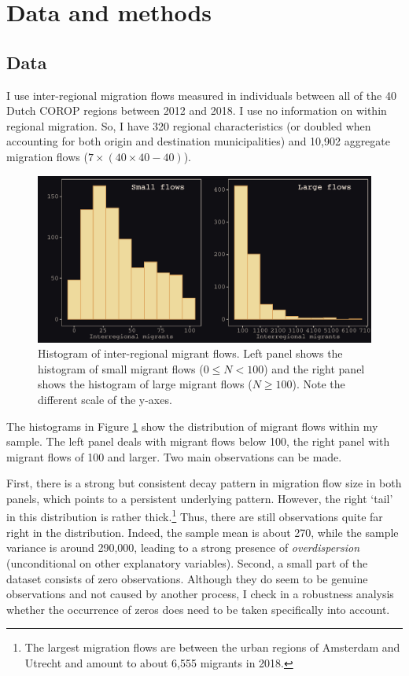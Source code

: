 \documentclass[11pt,parskip,abstracton,notitlepage, dvipsnames]{scrartcl}
\begin{document}
\section{Data and methods}

\subsection{Data}

I use inter-regional migration flows measured in individuals between
all of the 40 Dutch COROP regions between 2012 and 2018. I use no information on
within regional migration. So, I have 320 regional
characteristics (or doubled when accounting for both origin and destination
municipalities) and 10,902 aggregate migration flows ($7 \times (40 \times 40 - 40)$).

 \begin{figure}[ht]\centering %
   \includegraphics[width=1.0\linewidth]{./../../fig/hist_mig_corop.pdf}
          \caption{Histogram of inter-regional migrant flows. Left panel shows the histogram of
small migrant flows ($0 \leq N < 100$) and the right panel shows the histogram of
large migrant flows ($N \geq 100$). Note the different scale of the y-axes.}
          \label{fig:hist_mig_corop}
        \end{figure}

The histograms in Figure \ref{fig:hist_mig_corop} show the distribution of
migrant flows within my sample. The left panel deals with migrant flows below
100, the right panel with migrant flows of 100 and larger. Two main observations
can be made.

First, there is a strong but consistent decay pattern in migration flow size in
both panels, which points to a persistent underlying pattern. However, the right
`tail' in this distribution is rather thick.\footnote{The largest migration
  flows are between the urban regions of Amsterdam and Utrecht and amount to about
  6,555 migrants in 2018.} Thus, there are still observations quite far right in
the distribution. Indeed, the sample mean is about 270, while the sample
variance is around 290,000, leading to a strong presence of
\emph{overdispersion} (unconditional on other explanatory variables). Second, a
small part of the dataset consists of zero observations. Although they do seem
to be genuine observations and not caused by another process, I check in a
robustness analysis whether the occurrence of zeros does need to be taken
specifically into account.
\end{document}
